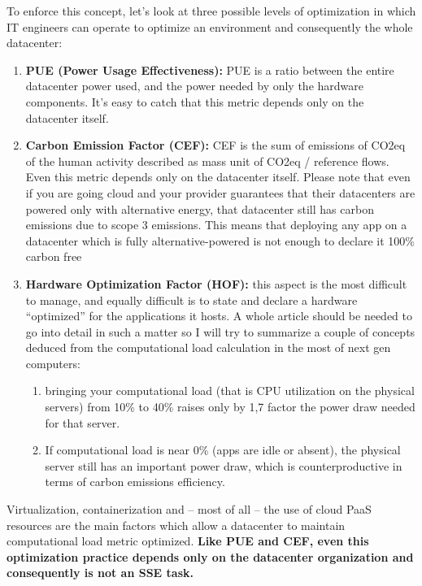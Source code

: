 \documentclass{article}
\begin{document}
\vspace{\baselineskip}
To enforce this concept, let’s look at three possible levels of optimization in which IT engineers can operate to optimize an environment and consequently the whole datacenter:

\begin{enumerate}
    \item \textbf{PUE (Power Usage Effectiveness):} PUE is a ratio between the entire datacenter power used, and the power needed by only the hardware components. It’s easy to catch that this metric depends only on the datacenter itself.
    \item \textbf{Carbon Emission Factor (CEF):} CEF is the sum of emissions of CO2eq of the human activity described as mass unit of CO2eq / reference flows. Even this metric depends only on the datacenter itself. Please note that even if you are going cloud and your provider guarantees that their datacenters are powered only with alternative energy, that datacenter still has carbon emissions due to scope 3 emissions. This means that deploying any app on a datacenter which is fully alternative-powered is not enough to declare it 100\% carbon free
    \item \textbf{Hardware Optimization Factor (HOF):} this aspect is the most difficult to manage, and equally difficult is to state and declare a hardware “optimized” for the applications it hosts. A whole article should be needed to go into detail in such a matter so I will try to summarize a couple of concepts deduced from the computational load calculation in the most of next gen computers:
    \begin{enumerate}
        \item bringing your computational load (that is CPU utilization on the physical servers) from 10\% to 40\% raises only by 1,7 factor the power draw needed for that server.
        \item If computational load is near 0\% (apps are idle or absent), the physical server still has an important power draw, which is counterproductive in terms of carbon emissions efficiency.
    \end{enumerate}
\end{enumerate}

Virtualization, containerization and – most of all – the use of cloud PaaS resources are the main factors which allow a datacenter to maintain computational load metric optimized. \textbf{Like PUE and CEF, even this optimization practice depends only on the datacenter organization and consequently is not an SSE task.}
\end{document}
